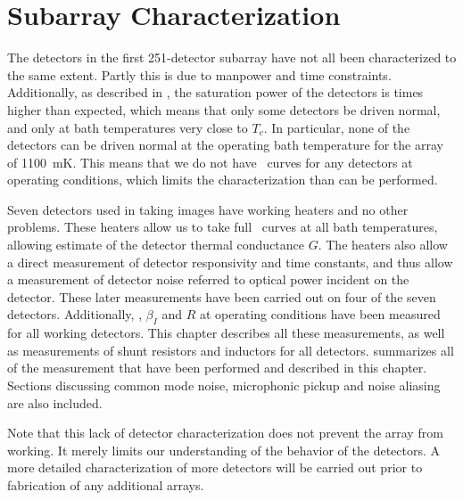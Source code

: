 \chapter{Subarray Characterization}\label{c:det-array}

The detectors in the first 251-detector subarray have not all been characterized to the same extent.
Partly this is due to manpower and time constraints.
Additionally, as described in , the saturation power of the detectors is  times higher than expected, which means that only some detectors be driven normal, and only at bath temperatures very close to $T_c$.
In particular, none of the detectors can be driven normal at the operating bath temperature for the array of 1100~mK.
This means that we do not have \IV\ curves for any detectors at operating conditions, which limits the characterization than can be performed.

Seven detectors used in taking images have working heaters and no other problems.
These heaters allow us to take full \IV\ curves at all bath temperatures, allowing estimate of the detector thermal conductance $G$.
The heaters also allow a direct measurement of detector responsivity and time constants, and thus allow a measurement of detector noise referred to optical power incident on the detector.
These later measurements have been carried out on four of the seven detectors.
Additionally, \Loop, $\beta_I$ and $R$ at operating conditions have been measured for all working detectors.
This chapter describes all these measurements, as well as measurements of shunt resistors and inductors for all detectors.
 summarizes all of the measurement that have been performed and described in this chapter.
Sections discussing common mode noise, microphonic pickup and noise aliasing are also included.

Note that this lack of detector characterization does not prevent the array from working.
It merely limits our understanding of the behavior of the detectors.
A more detailed characterization of more detectors will be carried out prior to fabrication of any additional arrays.

